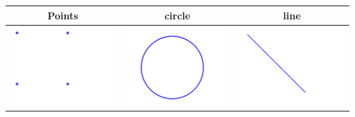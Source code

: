 \begin{tabular}{|c|c|c|}
 Points & circle & line \\ \hline
\includegraphics[width=4cm]{fig_exp/points.png} &
 \includegraphics[width=4cm]{fig_exp/circle.png} &
\includegraphics[width=4cm]{fig_exp/line.png}
\end{tabular}
